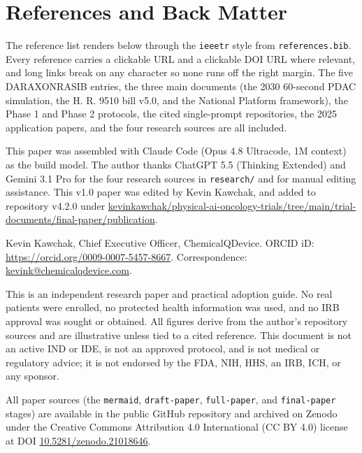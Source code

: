 \section{References and Back Matter}

The reference list renders below through the \texttt{ieeetr} style from
\texttt{references.bib}. Every reference carries a clickable URL and a clickable DOI
URL where relevant, and long links break on any character so none runs off the
right margin. The five DARAXONRASIB entries, the three main documents (the 2030
60-second PDAC simulation, the H. R. 9510 bill v5.0, and the National Platform
framework), the Phase 1 and Phase 2 protocols, the cited single-prompt repositories,
the 2025 application papers, and the four research sources are all included.

This paper was assembled with Claude Code (Opus 4.8 Ultracode, 1M context) as the build model.
The author thanks ChatGPT 5.5 (Thinking Extended) and Gemini 3.1 Pro for the four
research sources in \texttt{research/} and for manual editing assistance. This v1.0
paper was edited by Kevin Kawchak, and added to repository v4.2.0 under \href{https://github.com/kevinkawchak/physical-ai-oncology-trials/tree/main/trial-documents/final-paper/publication}{kevinkawchak/physical-ai-oncology-trials/tree/main/trial-documents/final-paper/publication}.

Kevin Kawchak, Chief Executive Officer, ChemicalQDevice. ORCID iD:
\href{https://orcid.org/0009-0007-5457-8667}{https://orcid.org/0009-0007-5457-8667}.
Correspondence: \href{mailto:kevink@chemicalqdevice.com}{kevink@chemicalqdevice.com}.

This is an independent research paper and practical adoption guide. No real patients
were enrolled, no protected health information was used, and no IRB approval was
sought or obtained. All figures derive from the author's repository sources and are
illustrative unless tied to a cited reference. This document is not an active IND or
IDE, is not an approved protocol, and is not medical or regulatory advice; it is not
endorsed by the FDA, NIH, HHS, an IRB, ICH, or any sponsor.

All paper sources (the \texttt{mermaid}, \texttt{draft-paper}, \texttt{full-paper},
and \texttt{final-paper} stages) are available in the public GitHub repository and
archived on Zenodo under the Creative Commons Attribution 4.0 International (CC BY
4.0) license at DOI
\href{https://doi.org/10.5281/zenodo.21018646}{10.5281/zenodo.21018646}.

